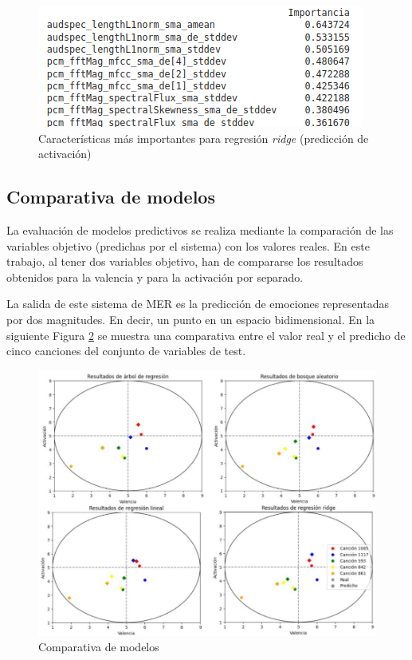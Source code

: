 \documentclass[12pt,a4paper]{article}
\begin{document}
\begin{figure}[H]
	\centering
	\includegraphics[width=0.7\linewidth]{figs/import_ridge_ar}
	\caption{Características más importantes para regresión \textit{ridge} (predicción de activación)}
	\label{fig:importridgear}
\end{figure}
	


\subsection{Comparativa de modelos}
La evaluación de modelos predictivos se realiza mediante la comparación de las variables objetivo (predichas por el sistema) con los valores reales. En este trabajo, al tener dos variables objetivo, han de compararse los resultados obtenidos para la valencia y para la activación por separado.

La salida de este sistema de MER es la predicción de emociones representadas por dos magnitudes. En decir, un punto en un espacio bidimensional. En la siguiente Figura \ref{fig:results} se muestra una comparativa entre el valor real y el predicho de cinco canciones del conjunto de variables de test. 
\begin{figure}[H]
	\centering
	\includegraphics[width=1\linewidth]{figs/results}
	\caption{Comparativa de modelos}
	\label{fig:results}
\end{figure}
\end{document}

